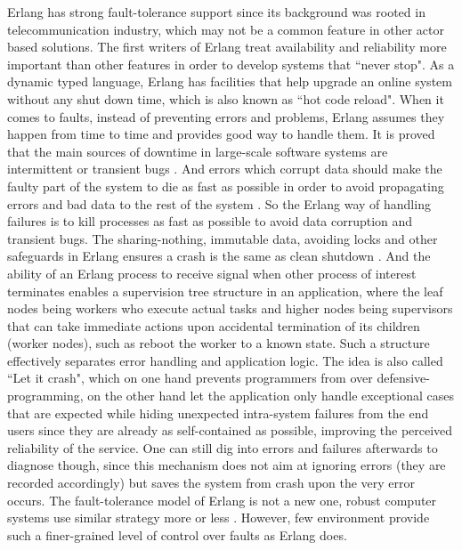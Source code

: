 Erlang has strong fault-tolerance support since its background was rooted in telecommunication industry, which may not be a common feature in other actor based solutions. The first writers of Erlang treat availability and reliability more important than other features in order to develop systems that ``never stop". As a dynamic typed language, Erlang has facilities that help upgrade an online system without any shut down time, which is also known as ``hot code reload". When it comes to faults, instead of preventing errors and problems, Erlang assumes they happen from time to time and provides good way to handle them. It is proved that the main sources of downtime in large-scale software systems are intermittent or transient bugs \cite{candea2003crash}. And errors which corrupt data should make the faulty part of the system to die as fast as possible in order to avoid propagating errors and bad data to the rest of the system \cite{learn_you_some_erlang}. So the Erlang way of handling failures is to kill processes as fast as possible to avoid data corruption and transient bugs. The sharing-nothing, immutable data, avoiding locks and other safeguards in Erlang ensures a crash is the same as clean shutdown \cite{learn_you_some_erlang}. And the ability of an Erlang process to receive signal when other process of interest terminates enables a supervision tree structure in an application, where the leaf nodes being workers who execute actual tasks and higher nodes being supervisors that can take immediate actions upon accidental termination of its children (worker nodes), such as reboot the worker to a known state. Such a structure effectively separates error handling and application logic. The idea is also called ``Let it crash",  which on one hand prevents programmers from over defensive-programming, on the other hand let the application only handle exceptional cases that are expected while hiding unexpected intra-system failures from the end users since they are already as self-contained as possible, improving the perceived reliability of the service. One can still dig into errors and failures afterwards to diagnose though, since this mechanism does not aim at ignoring errors (they are recorded accordingly) but saves the system from crash upon the very error occurs. The fault-tolerance model of Erlang is not a new one, robust computer systems use similar strategy more or less \cite{gray1986computers}. However, few environment provide such a finer-grained level of control over faults as Erlang does.


